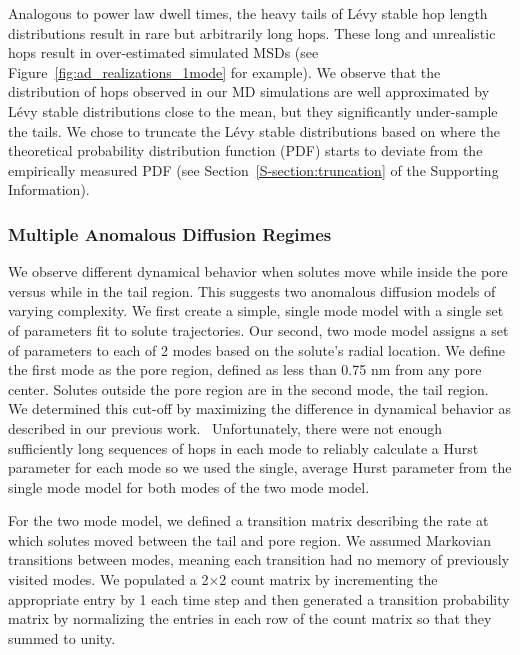 \documentclass[journal=jctcce,manuscript=article]{achemso}
\begin{document}
  Analogous to power law dwell times, the heavy tails of L\'evy stable hop
  length distributions result in rare but arbitrarily long hops. These long and
  unrealistic hops result in over-estimated simulated MSDs (see
  Figure~\ref{fig:ad_realizations_1mode} for example). We observe that the
  distribution of hops observed in our MD simulations are well approximated by
  L\'evy stable distributions close to the mean, but they significantly
  under-sample the tails. We chose to truncate the L\'evy stable distributions
  based on where the theoretical probability distribution function (PDF) starts
  to deviate from the empirically measured PDF (see
  Section~\ref{S-section:truncation} of the Supporting Information).~\cite{mantegna_stochastic_1994}

  \subsubsection*{Multiple Anomalous Diffusion Regimes}
  
  We observe different dynamical behavior when solutes move while inside the
  pore versus while in the tail region. This suggests two anomalous diffusion
  models of varying complexity. We first create a simple, single mode model
  with a single set of parameters fit to solute trajectories. Our second, two
  mode model assigns a set of parameters to each of 2 modes based on the
  solute's radial location. We define the first mode as the pore region,
  defined as less than 0.75 nm from any pore center. Solutes outside the pore
  region are in the second mode, the tail region. We determined this cut-off by
  maximizing the difference in dynamical behavior as described in our previous
  work.~\cite{coscia_chemically_2019} Unfortunately, there were not enough
  sufficiently long sequences of hops in each mode to reliably calculate a
  Hurst parameter for each mode so we used the single, average Hurst parameter
  from the single mode model for both modes of the two mode model.
 
  For the two mode model, we defined a transition matrix describing the rate at
  which solutes moved between the tail and pore region. We assumed Markovian
  transitions between modes, meaning each transition had no memory of
  previously visited modes. We populated a 2$\times$2 count matrix by
  incrementing the appropriate entry by 1 each time step and then generated a
  transition probability matrix by normalizing the entries in each row of the
  count matrix so that they summed to unity.
  
\end{document}
